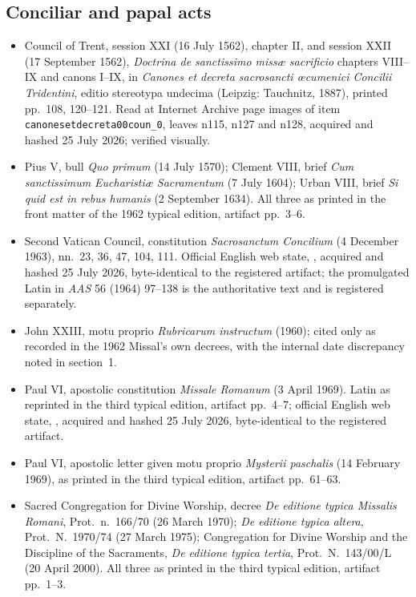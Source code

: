 \subsection*{Conciliar and papal acts}

{\fontsize{8.6}{9.6}\selectfont
\begin{itemize}[itemsep=0pt,parsep=0pt,topsep=0.05em]
\item Council of Trent, session XXI (16 July 1562), chapter II, and session XXII (17 September 1562), \emph{Doctrina de sanctissimo missæ sacrificio} chapters VIII--IX and canons I--IX, in \emph{Canones et decreta sacrosancti œcumenici Concilii Tridentini}, editio stereotypa undecima (Leipzig: Tauchnitz, 1887), printed pp.~108, 120--121. Read at Internet Archive page images of item \texttt{canonesetdecreta00coun\_0}, leaves n115, n127 and n128, acquired and hashed 25 July 2026; verified visually.
\item Pius V, bull \emph{Quo primum} (14 July 1570); Clement VIII, brief \emph{Cum sanctissimum Eucharistiæ Sacramentum} (7 July 1604); Urban VIII, brief \emph{Si quid est in rebus humanis} (2 September 1634). All three as printed in the front matter of the 1962 typical edition, artifact pp.~3--6.
\item Second Vatican Council, constitution \emph{Sacrosanctum Concilium} (4 December 1963), nn.~23, 36, 47, 104, 111. Official English web state, , acquired and hashed 25 July 2026, byte-identical to the registered artifact; the promulgated Latin in \emph{AAS} 56 (1964) 97--138 is the authoritative text and is registered separately.
\item John XXIII, motu proprio \emph{Rubricarum instructum} (1960); cited only as recorded in the 1962 Missal's own decrees, with the internal date discrepancy noted in section~1.
\item Paul VI, apostolic constitution \emph{Missale Romanum} (3 April 1969). Latin as reprinted in the third typical edition, artifact pp.~4--7; official English web state, , acquired and hashed 25 July 2026, byte-identical to the registered artifact.
\item Paul VI, apostolic letter given motu proprio \emph{Mysterii paschalis} (14 February 1969), as printed in the third typical edition, artifact pp.~61--63.
\item Sacred Congregation for Divine Worship, decree \emph{De editione typica Missalis Romani}, Prot.\ n.~166/70 (26 March 1970); \emph{De editione typica altera}, Prot.\ N.~1970/74 (27 March 1975); Congregation for Divine Worship and the Discipline of the Sacraments, \emph{De editione typica tertia}, Prot.\ N.~143/00/L (20 April 2000). All three as printed in the third typical edition, artifact pp.~1--3.
\end{itemize}}

